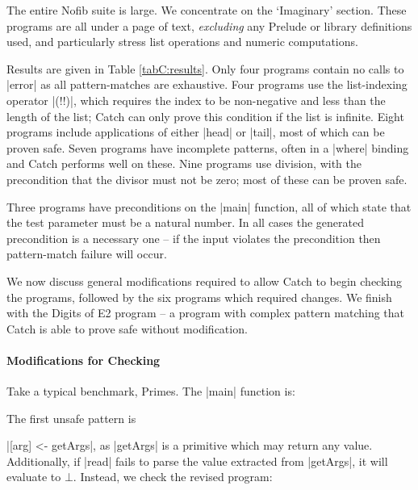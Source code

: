 The entire Nofib suite \cite{nofib} is large. We concentrate on the `Imaginary' section. These programs are all under a page of text, \textit{excluding} any Prelude or library definitions used, and particularly stress list operations and numeric computations.

Results are given in Table \ref{tabC:results}. Only four programs contain no calls to |error| as all pattern-matches are exhaustive. Four programs use the list-indexing operator |(!!)|, which requires the index to be non-negative and less than the length of the list; Catch can only prove this condition if the list is infinite. Eight programs include applications of either |head| or |tail|, most of which can be proven safe. Seven programs have incomplete patterns, often in a |where| binding and Catch performs well on these. Nine programs use division, with the precondition that the divisor must not be zero; most of these can be proven safe.

Three programs have preconditions on the |main| function, all of which state that the test parameter must be a natural number. In all cases the generated precondition is a necessary one -- if the input violates the precondition then pattern-match failure will occur.

We now discuss general modifications required to allow Catch to begin checking the programs, followed by the six programs which required changes. We finish with the Digits of E2 program -- a program with complex pattern matching that Catch is able to prove safe without modification.

\paragraph{Modifications for Checking}

Take a typical benchmark, Primes. The |main| function is:

\begin{comment}
\begin{code}
primes :: [Int]
\end{code}
\end{comment}


The first unsafe pattern is \ignore|[arg] <- getArgs|, as |getArgs| is a primitive which may return any value. Additionally, if |read| fails to parse the value extracted from |getArgs|, it will evaluate to $\bot{}$. Instead, we check the revised program:

